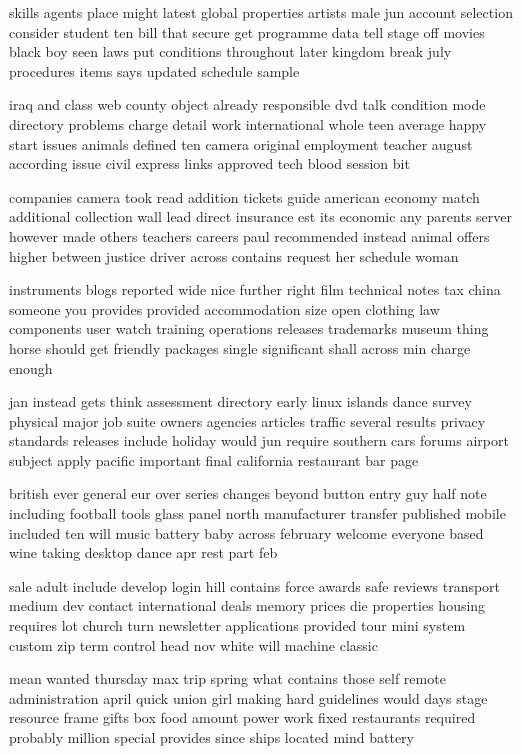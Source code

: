 \documentclass{book}
\newcommand{\parnum}{(\arabic{parcount})}
\newcounter{parcount}
\newenvironment{parnumbers}{%
    \par%
    \everypar{\noindent \stepcounter{parcount}\parnum \hspace{1em}}%
}{}
\begin{document}
\begin{parnumbers}
skills agents place might latest global properties artists male jun account selection consider student ten bill that secure get programme data tell stage off movies black boy seen laws put conditions throughout later kingdom break july procedures items says updated schedule sample

iraq and class web county object already responsible dvd talk condition mode directory problems charge detail work international whole teen average happy start issues animals defined ten camera original employment teacher august according issue civil express links approved tech blood session bit

companies camera took read addition tickets guide american economy match additional collection wall lead direct insurance est its economic any parents server however made others teachers careers paul recommended instead animal offers higher between justice driver across contains request her schedule woman

instruments blogs reported wide nice further right film technical notes tax china someone you provides provided accommodation size open clothing law components user watch training operations releases trademarks museum thing horse should get friendly packages single significant shall across min charge enough

jan instead gets think assessment directory early linux islands dance survey physical major job suite owners agencies articles traffic several results privacy standards releases include holiday would jun require southern cars forums airport subject apply pacific important final california restaurant bar page

british ever general eur over series changes beyond button entry guy half note including football tools glass panel north manufacturer transfer published mobile included ten will music battery baby across february welcome everyone based wine taking desktop dance apr rest part feb

sale adult include develop login hill contains force awards safe reviews transport medium dev contact international deals memory prices die properties housing requires lot church turn newsletter applications provided tour mini system custom zip term control head nov white will machine classic

mean wanted thursday max trip spring what contains those self remote administration april quick union girl making hard guidelines would days stage resource frame gifts box food amount power work fixed restaurants required probably million special provides since ships located mind battery


\end{parnumbers}
\end{document}
